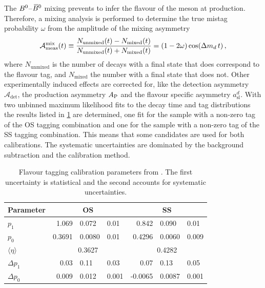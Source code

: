 The ${{B}^0}$--${{\kern 0.18em\overline{\kern -0.18em B}{}}{}^0}$ mixing prevents to infer the flavour of the \Bd meson at
production. Therefore, a mixing analysis is performed to determine the true
mistag probability $\omega$ from the amplitude of the mixing asymmetry
\begin{equation}
\mathcal{A}^{\text{mix}}_{\text{meas}} (t) \equiv \frac{N_{\text{unmixed}}(t) - N_{\text{mixed}}(t)}{N_{\text{unmixed}}(t) + N_{\text{mixed}}(t)}
 =(1-2\omega) \cos({\Delta m_{{d}}}\,t) \,,
\label{eq:dataanalysis:taggingcalibration:dsdcalibration:asymmetry}
\end{equation}
where $N_{\text{unmixed}}$ is the number of \BdToDsD decays with a final state
that does correspond to the flavour tag, and $N_{\text{mixed}}$ the number
with a final state that does not. Other experimentally induced effects are
corrected for, like the detection asymmetry $\mathcal{A}_{\mathrm{det}}$, the
production asymmetry $A_{\mathrm{P}}$ and the flavour specific asymmetry
$a_{\mathrm{sl}}^d$. With two unbinned maximum likelihood fits to the decay time
and tag distributions the results listed in
\cref{tab:dataanalysis:taggingcalibration:dsdcalibration} are determined, one
fit for the sample with a non-zero tag of the OS tagging combination and one
for the sample with a non-zero tag of the SS tagging combination. This means
that some candidates are used for both calibrations. The systematic
uncertainties are dominated by the background subtraction and the calibration
method.

\begin{table}[htb]
\caption{Flavour tagging calibration parameters from \BdToDsD. The first
uncertainty is statistical and the second accounts for systematic
uncertainties.}
\label{tab:dataanalysis:taggingcalibration:dsdcalibration}
\centering
\begin{tabular}{lr@{$\,\pm\,$}l@{$\,\pm\,$}lr@{$\,\pm\,$}l@{$\,\pm\,$}l}
  \toprule
  Parameter           & \multicolumn{3}{c}{OS}   & \multicolumn{3}{c}{SS} \\
  \midrule
  $p_{1}$               & 1.069   & 0.072  & 0.01  & 0.842   & 0.090  & 0.01  \\
  $p_{0}$               & 0.3691  & 0.0080 & 0.01  & 0.4296  & 0.0060 & 0.009 \\
  $\langle \eta\rangle$ & \multicolumn{3}{c}{0.3627} & \multicolumn{3}{c}{0.4282} \\
  $\Delta p_{1}$        & 0.03    & 0.11   & 0.03  & 0.07    & 0.13   & 0.05  \\
  $\Delta p_{0}$        & 0.009   & 0.012  & 0.001 & -0.0065 & 0.0087 & 0.001 \\
  \bottomrule
\end{tabular}
\end{table}

